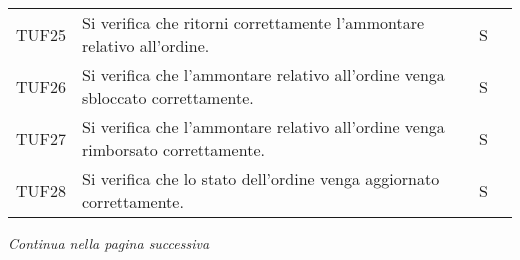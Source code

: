 \begin{table}[H]
\begin{tabular}{c|p{8cm}|c|c}
    TUF25 & Si verifica che ritorni correttamente l'ammontare relativo all'ordine.                                     & S \\
    TUF26 & Si verifica che l'ammontare relativo all'ordine venga sbloccato correttamente.                             & S \\
    TUF27 & Si verifica che l'ammontare relativo all'ordine venga rimborsato correttamente.                            & S \\
    TUF28 & Si verifica che lo stato dell'ordine venga aggiornato correttamente.                                       & S \\
  \end{tabular}
\end{table}
\begin{center}
  \textit{\small Continua nella pagina successiva}
\end{center}
